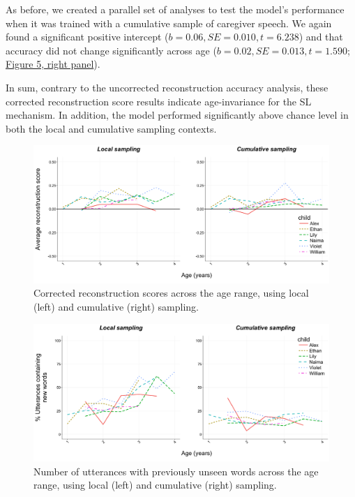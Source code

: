 \documentclass[man,mask,floatsintext]{apa6}
\theoremstyle{definition}
\theoremstyle{definition}
\theoremstyle{definition}
\theoremstyle{remark}
\begin{document}
As before, we created a parallel set of analyses to test the model's
performance when it was trained with a cumulative sample of caregiver
speech. We again found a significant positive intercept
(\(b= 0.06, SE = 0.010, t = 6.238\)) and that accuracy did not change
significantly across age (\(b=0.02, SE = 0.013, t = 1.590\);
\protect\hyperlink{fig5}{Figure 5, right panel}).

In sum, contrary to the uncorrected reconstruction accuracy analysis,
these corrected reconstruction score results indicate age-invariance for
the SL mechanism. In addition, the model performed significantly above
chance level in both the local and cumulative sampling contexts.

\begin{figure}

{\centering \includegraphics[width=0.95\linewidth]{images/plotbothreconstruction} 

}

\caption{Corrected reconstruction scores across the age range, using local (left) and cumulative (right) sampling.}\label{fig:fig5}
\end{figure}

\begin{figure}

{\centering \includegraphics[width=0.95\linewidth]{images/plotbothunknown} 

}

\caption{Number of utterances with previously unseen words across the age range, using local (left) and cumulative (right) sampling.}\label{fig:fig6}
\end{figure}
\end{document}
